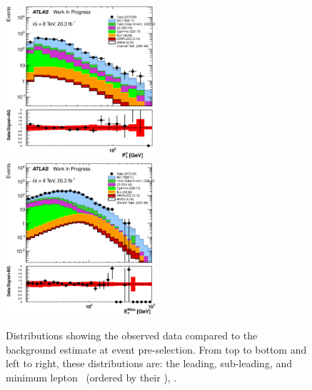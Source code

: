 \begin{figure}[htb]
\includegraphics[width=0.495\textwidth]{figures/appendix_signal_selection/Nov24Update_FakeSys_KFacSys_LogY_NoRebin/output/jobs/MxM/DataFull_Rates_May13_FakeRatesExactly2Loose_MuonMxMBJetGt0_ElBJetGt0SubtractPC_MxM/PreselectionNov23_15_physics/weight_all/eps/MinimumLeptonPt_histratio.eps}
\includegraphics[width=0.495\textwidth]{figures/appendix_signal_selection/Nov24Update_FakeSys_KFacSys_LogY_NoRebin/output/jobs/MxM/DataFull_Rates_May13_FakeRatesExactly2Loose_MuonMxMBJetGt0_ElBJetGt0SubtractPC_MxM/PreselectionNov23_15_physics/weight_all/eps/MET_Et_histratio.eps}
\caption{Distributions showing the observed data compared to the background estimate at event pre-selection.
From top to bottom and left to right, these distributions are: the leading, 
sub-leading, and minimum lepton \pt~(ordered by their \pt), 
\MET.
}
\label{fig:preselection1}
\end{figure}

